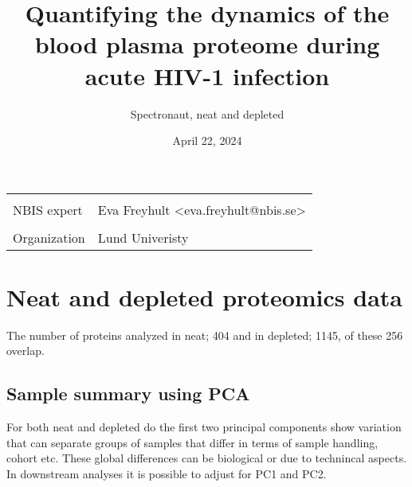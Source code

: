 \documentclass[
]{article}
\title{Quantifying the dynamics of the blood plasma proteome during acute HIV-1 infection}
\subtitle{Spectronaut, neat and depleted}
\author{}
\date{\vspace{-2.5em}April 22, 2024}
\begin{document}
\maketitle

\begin{table}[H]
\centering
\begin{tabular}{ll}
\toprule
\cellcolor{gray!6}{Issue number} & \cellcolor{gray!6}{5800}\\
NBIS expert & Eva Freyhult <eva.freyhult@nbis.se>\\
\cellcolor{gray!6}{PI} & \cellcolor{gray!6}{Joakim Esbjörnsson <joakim.esbjornsson@med.lu.se>}\\
Organization & Lund Univeristy\\
\bottomrule
\end{tabular}
\end{table}

\hypertarget{neat-and-depleted-proteomics-data}{%
\section{Neat and depleted proteomics data}\label{neat-and-depleted-proteomics-data}}

The number of proteins analyzed in neat; 404 and in depleted; 1145, of these 256 overlap.

\FloatBarrier

\FloatBarrier

\FloatBarrier

\hypertarget{sample-summary-using-pca}{%
\subsection{Sample summary using PCA}\label{sample-summary-using-pca}}

For both neat and depleted do the first two principal components show variation that can separate groups of samples that differ in terms of sample handling, cohort etc. These global differences can be biological or due to technincal aspects. In downstream analyses it is possible to adjust for PC1 and PC2.
\end{document}
